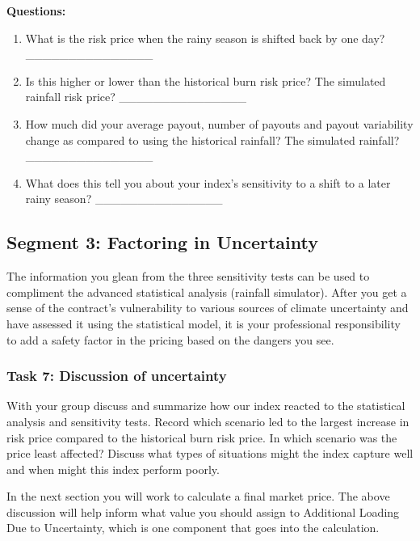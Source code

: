 \documentclass[letterpaper,10pt,english]{sphinxmanual}
\begin{document}
\textbf{Questions:}
\begin{enumerate}
\item {} 
What is the risk price when the rainy season is shifted back by one day? \_\_\_\_\_\_\_\_\_\_\_\_\_\_\_

\item {} 
Is this higher or lower than the historical burn risk price? The simulated rainfall risk price? \_\_\_\_\_\_\_\_\_\_\_\_\_\_\_

\item {} 
How much did your average payout, number of payouts and payout variability change as compared to using the historical rainfall?  The simulated rainfall? \_\_\_\_\_\_\_\_\_\_\_\_\_\_\_

\item {} 
What does this tell you about your index's sensitivity to a shift to a later rainy season? \_\_\_\_\_\_\_\_\_\_\_\_\_\_\_

\end{enumerate}


\subsection{Segment 3: Factoring in Uncertainty}
\label{wiiet/wiiet_initialtomarketpricing_Web:segment-3-factoring-in-uncertainty}
The information you glean from the three sensitivity tests can be used to compliment the advanced statistical analysis (rainfall simulator). After you get a sense of the contract's vulnerability to various sources of climate uncertainty and have assessed it using the statistical model, it is your professional responsibility to add a safety factor in the pricing based on the dangers you see.


\subsubsection{Task 7: Discussion of uncertainty}
\label{wiiet/wiiet_initialtomarketpricing_Web:task-7-discussion-of-uncertainty}
With your group discuss and summarize how our index reacted to the statistical analysis and sensitivity tests. Record which scenario led to the largest increase in risk price compared to the historical burn risk price. In which scenario was the price least affected? Discuss what types of situations might the index capture well and when might this index perform poorly.

In the next section you will work to calculate a final market price. The above discussion will help inform what value you should assign to Additional Loading Due to Uncertainty, which is one component that goes into the calculation.
\end{document}
